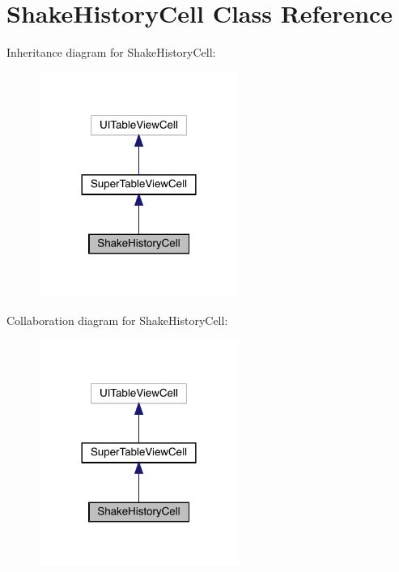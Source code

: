 \hypertarget{interface_shake_history_cell}{}\section{Shake\+History\+Cell Class Reference}
\label{interface_shake_history_cell}


Inheritance diagram for Shake\+History\+Cell\+:\nopagebreak
\begin{figure}[H]
\begin{center}
\leavevmode
\includegraphics[width=185pt]{interface_shake_history_cell__inherit__graph}
\end{center}
\end{figure}


Collaboration diagram for Shake\+History\+Cell\+:\nopagebreak
\begin{figure}[H]
\begin{center}
\leavevmode
\includegraphics[width=185pt]{interface_shake_history_cell__coll__graph}
\end{center}
\end{figure}
